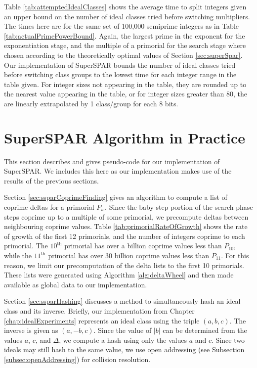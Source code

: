 \documentclass{ucalgthes1}
\theoremstyle{definition}
\begin{document}
Table \ref{tab:attemptedIdealClasses} shows the average time to split integers given an upper bound on the number of ideal classes tried before switching multipliers.  The times here are for the same set of 100,000 semiprime integers as in Table \ref{tab:actualPrimePowerBound}.  Again, the largest prime in the exponent for the exponentiation stage, and the multiple of a primorial for the search stage where chosen according to the theoretically optimal values of Section \ref{sec:superSpar}.  Our implementation of SuperSPAR bounds the number of ideal classes tried before switching class groups to the lowest time for each integer range in the table given.  For integer sizes not appearing in the table, they are rounded up to the nearest value appearing in the table, or for integer sizes greater than 80, the are linearly extrapolated by 1 class/group for each 8 bits.

\section{SuperSPAR Algorithm in Practice}

This section describes and gives pseudo-code for our implementation of SuperSPAR.   We includes this here as our implementation makes use of the results of the previous sections.

Section \ref{sec:ssparCoprimeFinding} gives an algorithm to compute a list of coprime deltas for a primorial $P_w$.  Since the baby-step portion of the search phase steps coprime up to a multiple of some primorial, we precompute deltas between neighbouring coprime values.  Table \ref{tab:primorialRateOfGrowth} shows the rate of growth of the first 12 primorials, and the number of integers coprime to each primorial.  The $10^{\textrm{th}}$ primorial has over a billion coprime values less than $P_{10}$, while the $11^{\textrm{th}}$ primorial has over 30 billion coprime values less than $P_{11}$.  For this reason, we limit our precomputation of the delta lists to the first 10 primorials.  These lists were generated using Algorithm \ref{alg:deltaWheel} and then made available as global data to our implementation.

Section \ref{sec:ssparHashing} discusses a method to simultaneously hash an ideal class and its inverse.  Briefly, our implementation from Chapter \ref{chap:idealExperiments} represents an ideal class using the triple $(a, b, c)$.  The inverse is given as $(a, -b, c)$.  Since the value of $|b|$ can be determined from the values $a$, $c$, and $\Delta$, we compute a hash using only the values $a$ and $c$.   Since two ideals may still hash to the same value, we use open addressing (see Subsection \ref{subsec:openAddressing}) for collision resolution.
\end{document}
